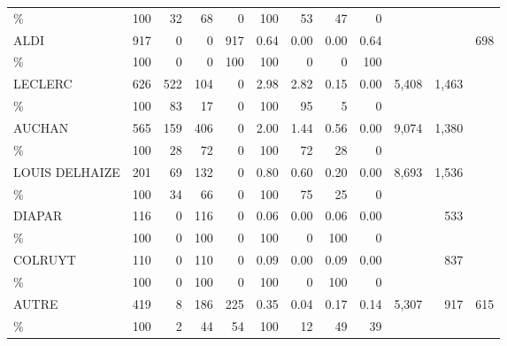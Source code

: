 \documentclass[11pt]{article}
\begin{document}
\begin{table}[H]
\begin{tabular}{l|rrrr|rrrr|rrr}
\%             &        100 &         32 &         68 &          0 &        100 &         53 &         47 &          0 &            &            &            \\
ALDI           &        917 &          0 &          0 &        917 &       0.64 &       0.00 &       0.00 &       0.64 &            &            &        698 \\
\%             &        100 &          0 &          0 &        100 &        100 &          0 &          0 &        100 &            &            &            \\
LECLERC        &        626 &        522 &        104 &          0 &       2.98 &       2.82 &       0.15 &       0.00 &      5,408 &      1,463 &            \\
\%             &        100 &         83 &         17 &          0 &        100 &         95 &          5 &          0 &            &            &            \\
AUCHAN         &        565 &        159 &        406 &          0 &       2.00 &       1.44 &       0.56 &       0.00 &      9,074 &      1,380 &            \\
\%             &        100 &         28 &         72 &          0 &        100 &         72 &         28 &          0 &            &            &            \\
LOUIS DELHAIZE &        201 &         69 &        132 &          0 &       0.80 &       0.60 &       0.20 &       0.00 &      8,693 &      1,536 &            \\
\%             &        100 &         34 &         66 &          0 &        100 &         75 &         25 &          0 &            &            &            \\
DIAPAR         &        116 &          0 &        116 &          0 &       0.06 &       0.00 &       0.06 &       0.00 &            &        533 &            \\
\%             &        100 &          0 &        100 &          0 &        100 &          0 &        100 &          0 &            &            &            \\
COLRUYT        &        110 &          0 &        110 &          0 &       0.09 &       0.00 &       0.09 &       0.00 &            &        837 &            \\
\%             &        100 &          0 &        100 &          0 &        100 &          0 &        100 &          0 &            &            &            \\
AUTRE          &        419 &          8 &        186 &        225 &       0.35 &       0.04 &       0.17 &       0.14 &      5,307 &        917 &        615 \\
\%             &        100 &          2 &         44 &         54 &        100 &         12 &         49 &         39 &            &            &            \\


\end{tabular}
\end{table}
\end{document}
